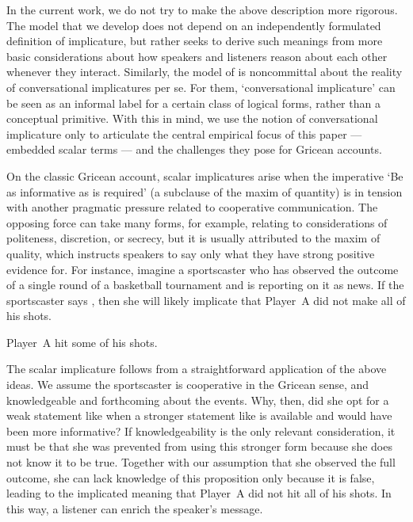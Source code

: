 \documentclass[leqno,12pt]{article}
\begin{document}
In the current work, we do not try to make the above description more
rigorous. The model that we develop does not depend on an
independently formulated definition of implicature, but rather seeks
to derive such meanings from more basic considerations about how
speakers and listeners reason about each other whenever they
interact. Similarly, the model of \citet{ChierchiaFoxSpector08} is
noncommittal about the reality of conversational implicatures per
se. For them, `conversational implicature' can be seen as an informal
label for a certain class of logical forms, rather than a conceptual
primitive. With this in mind, we use the notion of conversational
implicature only to articulate the central empirical focus of this
paper --- embedded scalar terms --- and the challenges they pose for
Gricean accounts.

On the classic Gricean account, scalar implicatures arise when the
imperative `Be as informative as is required' (a subclause of the
maxim of quantity) is in tension with another pragmatic pressure related to cooperative communication. The
opposing force can take many forms, for example, relating to
considerations of politeness, discretion, or secrecy, but it is
usually attributed to the maxim of quality, which instructs speakers
to say only what they have strong positive evidence for. For instance,
imagine a sportscaster who has observed the outcome of a single round
of a basketball tournament and is reporting on it as news. If the
sportscaster says , then she will likely implicate that
Player~A did not make all of his shots.
%
\begin{examples}
\item\label{some} Player~A hit some of his shots.
\end{examples}

The scalar implicature follows from a straightforward application of
the above ideas. We assume the sportscaster is cooperative in the
Gricean sense, and knowledgeable and forthcoming about the
events. Why, then, did she opt for a weak statement like
 when a stronger statement like
 is available and would have been more informative?
If knowledgeability is the only relevant consideration, it must be that she was prevented from using
this stronger form because she does not know it to be true. Together
with our assumption that she observed the full outcome, she can lack
knowledge of this proposition only because it is false, leading to the
implicated meaning that Player~A did not hit all of his shots. In this
way, a listener can enrich the speaker's message.
\end{document}

